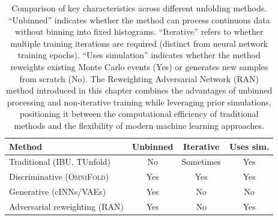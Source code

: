  \begin{table}
            \centering
            \caption[Comparison of unfolding method characteristics]{Comparison of key characteristics across different unfolding methods. ``Unbinned'' indicates whether the method can process continuous data without binning into fixed histograms. ``Iterative'' refers to whether multiple training iterations are required (distinct from neural network training epochs). ``Uses simulation'' indicates whether the method reweights existing Monte Carlo events (Yes) or generates new samples from scratch (No). The Reweighting Adversarial Network (RAN) method introduced in this chapter combines the advantages of unbinned processing and non-iterative training while leveraging prior simulations, positioning it between the computational efficiency of traditional methods and the flexibility of modern machine learning approaches.}
            \label{tab:unfold_methods}
            \begin{tabular}{lccc}
                \toprule
                \textbf{Method} & \textbf{Unbinned} & \textbf{Iterative} & \textbf{Uses sim.} \\
                \midrule
                Traditional (IBU, TUnfold) & No & Sometimes & Yes\\
                Discriminative (\textsc{OmniFold})      & Yes & Yes & Yes \\
                Generative (cINNs/VAEs)             & Yes & No  & No \\
                Adversarial reweighting (RAN)        & Yes & No  & Yes \\
                \bottomrule
            \end{tabular}
        \end{table}